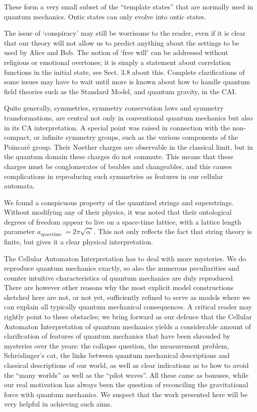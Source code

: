 \documentclass[main.tex]{subfiles}
\begin{document}
These form a very small subset of the “template states” that are normally used in quantum mechanics. Ontic states can only evolve into ontic states.

The issue of ‘conspiracy’ may still be worrisome to the reader, even if it is clear that our theory will not allow us to predict anything about the settings to be used by Alice and Bob. The notion of ‘free will’ can be addressed without religious or emotional overtones; it is simply a statement about correlation functions in the initial state, see Sect. 3.8 about this. Complete clarifications of some issues may have to wait until more is known about how to handle quantum field theories such as the Standard Model, and quantum gravity, in the CAI.

Quite generally, symmetries, symmetry conservation laws and symmetry transformations, are central not only in conventional quantum mechanics but also in its CA interpretation. A special point was raised in connection with the non-compact, or infinite symmetry groups, such as the various components of the Poincaré group. Their Noether charges are observable in the classical limit, but in the quantum domain these charges do not commute. This means that these charges must be conglomerates of beables and changeables, and this causes complications in reproducing
such symmetries as features in our cellular automata.

We found a conspicuous property of the quantized strings and superstrings. Without modifying any of their physics, it was noted that their ontological degrees of freedom appear to live on a space-time lattice, with a lattice length parameter $a_{\text {spacetime }}=2 \pi \sqrt{\alpha^{\prime}} .$ This not only reflects the fact that string theory is finite, but gives it a clear physical interpretation.

The Cellular Automaton Interpretation has to deal with more mysteries. We do reproduce quantum mechanics exactly, so also the numerous peculiarities and counter intuitive characteristics of quantum mechanics are duly reproduced. There are however other reasons why the most explicit model constructions sketched here are not, or not yet, sufficiently refined to serve as models where we can explain all typically quantum mechanical consequences. A critical reader may rightly point to these obstacles; we bring forward as our defence that the Cellular Automaton Interpretation of quantum mechanics yields a considerable amount of clarification of features of quantum mechanics that have been shrouded by mysteries over the years: the collapse question, the measurement problem, Schrödinger’s cat, the links between quantum mechanical descriptions and classical descriptions of our world, as well as clear indications as to how to avoid the “many worlds” as well as the “pilot waves”. All these came as bonuses, while our real motivation has always been the question of reconciling the gravitational force with quantum mechanics. We suspect that the work presented here will be very helpful in achieving such aims.
\end{document}
